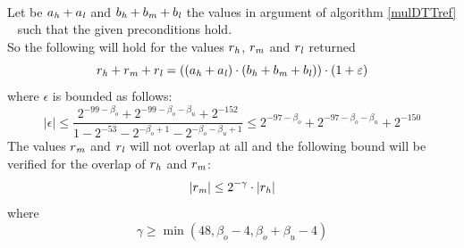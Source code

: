 \begin{theorem} ~ \\
Let be $a_{\mathit{h}} + a_{\mathit{l}}$ and $b_{\mathit{h}} + b_{\mathit{m}} + b_{\mathit{l}}$ the values in argument of algorithm \ref{mulDTTref} \MulDTT~ such that 
the given preconditions hold.\\
So the following will hold for the values $r_{\mathit{h}}$, $r_{\mathit{m}}$ and $r_{\mathit{l}}$ returned
$$r_{\mathit{h}} + r_{\mathit{m}} + r_{\mathit{l}} = \left(\left(a_{\mathit{h}} + a_{\mathit{l}} \right) \cdot \left( b_{\mathit{h}} + b_{\mathit{m}} + b_{\mathit{l}} \right)\right) \cdot \left(1 + \varepsilon\right)$$
where $\epsilon$ is bounded as follows:
$$\left \vert \epsilon \right \vert \leq \frac{2^{-99 - \beta_o} + 2^{-99 - \beta_o - \beta_u} + 2^{-152}}
                                              {1 - 2^{-53} - 2^{-\beta_o + 1} - 2^{-\beta_o - \beta_u + 1}}
                                    \leq 2^{-97 - \beta_o} + 2^{-97 - \beta_o - \beta_u} + 2^{-150}$$
The values $r_{\mathit{m}}$ and  $r_{\mathit{l}}$ will not overlap at all and the following bound will be verified for the overlap of 
$r_{\mathit{h}}$ and $r_{\mathit{m}}$:
$$\left \vert r_{\mathit{m}} \right \vert \leq 2^{-\gamma} \cdot \left \vert r_{\mathit{h}} \right \vert$$
where
$$\gamma \geq \min\left( 48, \beta_o - 4, \beta_o + \beta_u - 4 \right)$$
\end{theorem}

